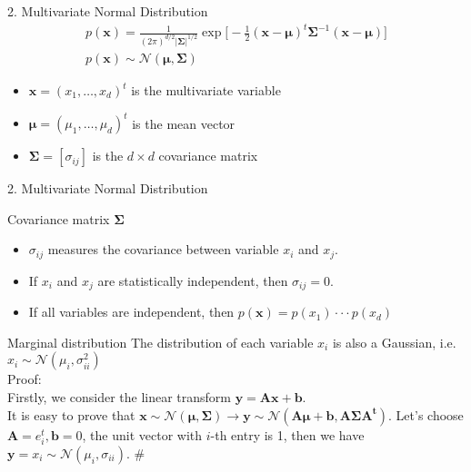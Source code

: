 \documentclass[compress,blue]{beamer}
\begin{document}
\begin{frame}{2. Multivariate Normal Distribution}
	\centering
	\begin{align}
		p(\mathbf{x}) = \frac{1}{(2\pi)^{d/2}|\mathbf{\Sigma}|^{1/2}} \exp\Big[-\frac{1}{2}(\mathbf{x}-\mathbf{\mu})^t\mathbf{\Sigma}^{-1}(\mathbf{x}-\mathbf{\mu})\Big] \nonumber\\
		p(\mathbf{x}) \sim \mathcal{N}(\mathbf{\mu}, \mathbf{\Sigma}) \nonumber\qquad\qquad\qquad\qquad
	\end{align}	
	\begin{itemize}
		\item<2-> $\mathbf{x} = (x_1, \hdots, x_d)^t$ is the multivariate variable
		\item<3-> $\mathbf{\mu} = (\mu_1, \hdots, \mu_d)^t$ is the mean vector
		\item<4-> $\mathbf{\Sigma}=[\sigma_{ij}]$ is the $d\times d$ covariance matrix
	\end{itemize}
\end{frame}

\begin{frame}{2. Multivariate Normal Distribution}
	\begin{block}{Covariance matrix $\mathbf{\Sigma}$}
		\begin{itemize}
			\item $\sigma_{ij}$ measures the covariance between variable $x_i$ and $x_j$. 
			\item If $x_i$ and $x_j$ are statistically independent, then $\sigma_{ij}=0$.
			\item If all variables are independent, then $p(\mathbf{x}) = p(x_1)\cdot\cdot\cdot p(x_d)$
		\end{itemize}
	\end{block}
	\pause
	\begin{block}{Marginal distribution}
		The distribution of each variable $x_i$ is also a Gaussian, i.e. $x_i \sim \mathcal{N}(\mu_i, \sigma^2_{ii})$ \\
		Proof: \\
		Firstly, we consider the linear transform $\mathbf{y} = \mathbf{A}\mathbf{x} + \mathbf{b}$. \\
		It is easy to prove that $\mathbf{x} \sim \mathcal{N}(\mathbf{\mu}, \mathbf{\Sigma}) \rightarrow \mathbf{y}\sim \mathcal{N}(\mathbf{A}\mathbf{\mu}+\mathbf{b}, \mathbf{A\Sigma A^t})$.
		Let's choose $\mathbf{A} = e^t_i, \mathbf{b}=0$, the unit vector with $i$-th entry is 1, then we have $\mathbf{y} = x_i \sim \mathcal{N}(\mu_i, \sigma_{ii})$. \#
	\end{block}
\end{frame}
\end{document}
